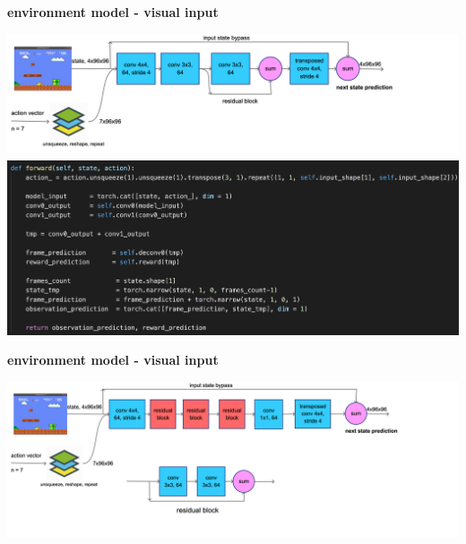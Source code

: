 \documentclass[xcolor=dvipsnames]{beamer}
\begin{document}
\begin{frame}{\bf environment model - visual input}

  {\centering \includegraphics[scale=0.12]{../diagrams/convcuriositydetail.png}}
  {\centering \includegraphics[scale=0.3]{../images/curiosity_conv.png}}

\end{frame}

\begin{frame}{\bf environment model - visual input}

  {\centering \includegraphics[scale=0.12]{../diagrams/convresnetcuriositydetail.png}}

\end{frame}
\end{document}
